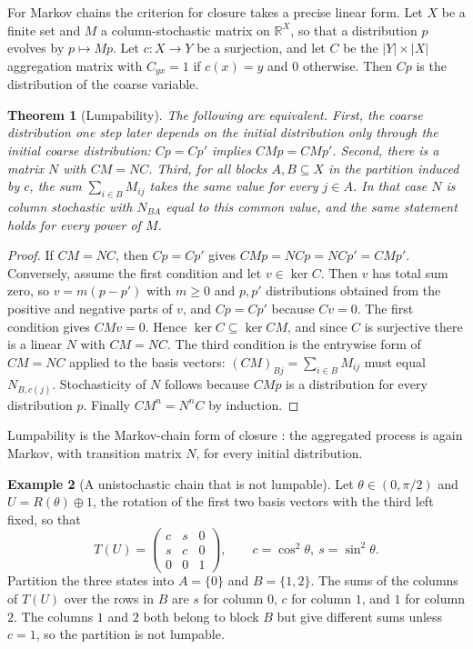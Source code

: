 \documentclass[11pt,oneside]{book}
\newtheorem{theorem}{Theorem}[chapter]
\theoremstyle{definition}
\newtheorem{example}[theorem]{Example}
\theoremstyle{remark}
\newcommand{\R}{\mathbb{R}}
\begin{document}
For Markov chains the criterion for closure takes a precise linear form. Let $X$ be a finite set and $M$ a column-stochastic matrix on $\R^X$, so that a distribution $p$ evolves by $p\mapsto Mp$. Let $c\colon X\to Y$ be a surjection, and let $C$ be the $|Y|\times|X|$ aggregation matrix with $C_{yx}=1$ if $c(x)=y$ and $0$ otherwise. Then $Cp$ is the distribution of the coarse variable.

\begin{theorem}[Lumpability]\label{thm:lumpability}
The following are equivalent. First, the coarse distribution one step later depends on the initial distribution only through the initial coarse distribution: $Cp=Cp'$ implies $CMp=CMp'$. Second, there is a matrix $N$ with $CM=NC$. Third, for all blocks $A,B\subseteq X$ in the partition induced by $c$, the sum $\sum_{i\in B}M_{ij}$ takes the same value for every $j\in A$. In that case $N$ is column stochastic with $N_{BA}$ equal to this common value, and the same statement holds for every power of $M$.
\end{theorem}

\begin{proof}
If $CM=NC$, then $Cp=Cp'$ gives $CMp=NCp=NCp'=CMp'$. Conversely, assume the first condition and let $v\in\ker C$. Then $v$ has total sum zero, so $v=m(p-p')$ with $m\geq0$ and $p,p'$ distributions obtained from the positive and negative parts of $v$, and $Cp=Cp'$ because $Cv=0$. The first condition gives $CMv=0$. Hence $\ker C\subseteq\ker CM$, and since $C$ is surjective there is a linear $N$ with $CM=NC$. The third condition is the entrywise form of $CM=NC$ applied to the basis vectors: $(CM)_{Bj}=\sum_{i\in B}M_{ij}$ must equal $N_{B,c(j)}$. Stochasticity of $N$ follows because $CMp$ is a distribution for every distribution $p$. Finally $CM^n=N^nC$ by induction.
\end{proof}

Lumpability is the Markov-chain form of closure \cite{kemeny1960}: the aggregated process is again Markov, with transition matrix $N$, for every initial distribution.

\begin{example}[A unistochastic chain that is not lumpable]
Let $\theta\in(0,\pi/2)$ and $U=R(\theta)\oplus1$, the rotation of the first two basis vectors with the third left fixed, so that
\[
T(U)=\begin{pmatrix}c&s&0\\s&c&0\\0&0&1\end{pmatrix},\qquad c=\cos^2\theta,\ s=\sin^2\theta .
\]
Partition the three states into $A=\{0\}$ and $B=\{1,2\}$. The sums of the columns of $T(U)$ over the rows in $B$ are $s$ for column $0$, $c$ for column $1$, and $1$ for column $2$. The columns $1$ and $2$ both belong to block $B$ but give different sums unless $c=1$, so the partition is not lumpable.
\end{example}
\end{document}

